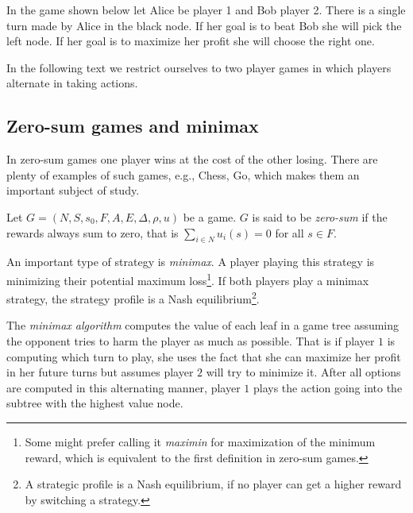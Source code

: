 \begin{example}
    In the game shown below let Alice be player 1 and Bob player 2.
    There is a single turn made by Alice in the black node.
If her goal is to beat Bob she will pick the left node.
If her goal is to maximize her profit she will choose the right one.

\begin{center}
\end{center}
\end{example}

In the following text
we restrict ourselves to two player games in which players alternate in
taking actions.

\subsection{Zero-sum games and minimax}

In zero-sum games one player wins at the cost of the other losing.
There are plenty of examples of such games, e.g., Chess, Go, which makes
them an important subject of study.

\begin{definition}
    Let $G = (N, S, s_0, F, A, E, \Delta, \rho, u)$ be a game.
    $G$ is said to be {\em zero-sum} if the rewards always sum to zero,
    that is $\sum_{i \in N} u_i(s) = 0$ for all $s \in F$.
\end{definition}

An important type of strategy is {\em minimax}. A player playing this
strategy is minimizing their potential maximum loss\footnote{Some might
prefer calling it {\em maximin} for maximization of the minimum reward,
which is equivalent to the first definition in zero-sum games.}. If both players play a
minimax strategy, the strategy profile is a Nash
equilibrium\footnote{
A strategic profile is a Nash equilibrium, if no player can get a higher
reward by switching a strategy.}.

The {\em minimax algorithm} computes the value of each leaf in a game
tree assuming the opponent tries to harm the player as much as
possible. That is if player $1$ is computing which turn to play,
she uses the fact that she can maximize her profit in her future turns
but assumes player $2$ will try to minimize it.
After all options are computed in this alternating manner,
player $1$ plays the action going into the subtree with the highest value node.

